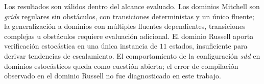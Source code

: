 Los resultados son válidos dentro del alcance evaluado. Los dominios Mitchell
son \textit{grids} regulares sin obstáculos, con transiciones deterministas y
un único fluente; la generalización a dominios con múltiples fluentes
dependientes, transiciones complejas u obstáculos requiere evaluación
adicional. El dominio Russell aporta verificación estocástica en una única
instancia de $11$ estados, insuficiente para derivar tendencias de
escalamiento. El comportamiento de la configuración \textit{sdd} en dominios
estocásticos queda como cuestión abierta; el error de compilación observado
en el dominio Russell no fue diagnosticado en este trabajo.
